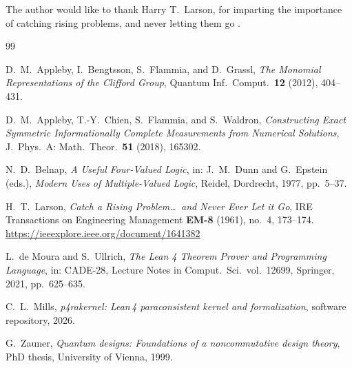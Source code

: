 \documentclass[12pt,a4paper]{article}
\begin{document}
The author would like to thank Harry T.\ Larson, for imparting the importance
of catching rising problems, and never letting them go \cite{Larson1961}.

\begin{thebibliography}{99}

D.\ M.\ Appleby, I.\ Bengtsson, S.\ Flammia, and D.\ Grassl,
\textit{The Monomial Representations of the Clifford Group},
Quantum Inf.\ Comput.\ \textbf{12} (2012), 404--431.

D.\ M.\ Appleby, T.-Y.\ Chien, S.\ Flammia, and S.\ Waldron,
\textit{Constructing Exact Symmetric Informationally Complete Measurements from
Numerical Solutions},
J.\ Phys.\ A: Math.\ Theor.\ \textbf{51} (2018), 165302.

N.\ D.\ Belnap,
\textit{A Useful Four-Valued Logic},
in: J.\ M.\ Dunn and G.\ Epstein (eds.), \textit{Modern Uses of Multiple-Valued Logic},
Reidel, Dordrecht, 1977, pp.\ 5--37.

H.\ T.\ Larson,
\textit{Catch a Rising Problem\ldots\ and Never Ever Let it Go},
IRE Transactions on Engineering Management \textbf{EM-8} (1961), no.\ 4, 173--174.
\url{https://ieeexplore.ieee.org/document/1641382}

L.\ de Moura and S.\ Ullrich,
\textit{The Lean 4 Theorem Prover and Programming Language},
in: CADE-28, Lecture Notes in Comput.\ Sci.\ vol.\ 12699, Springer, 2021, pp.\ 625--635.

C.\ L.\ Mills,
\textit{p4rakernel: Lean\,4 paraconsistent kernel and formalization},
software repository, 2026.

G.\ Zauner,
\textit{Quantum designs: Foundations of a noncommutative design theory},
PhD thesis, University of Vienna, 1999.

\end{thebibliography}
\end{document}
